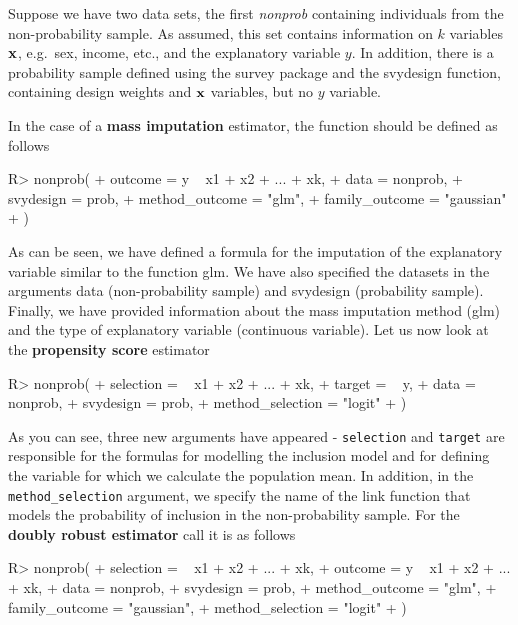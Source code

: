 \documentclass[
]{jss}
\begin{document}
Suppose we have two data sets, the first \textit{nonprob} containing
individuals from the non-probability sample. As assumed, this set
contains information on \(k\) variables \(\bold{x}\), e.g.~sex, income,
etc., and the explanatory variable \(y\). In addition, there is a
probability sample defined using the survey package and the svydesign
function, containing design weights and \(\bold{x}\) variables, but no
\(y\) variable.

In the case of a \textbf{mass imputation} estimator, the function should
be defined as follows

\begin{CodeChunk}
\begin{CodeInput}
R> nonprob(
+   outcome = y ~ x1 + x2 + ... + xk, 
+   data = nonprob, 
+   svydesign = prob, 
+   method_outcome = "glm", 
+   family_outcome = "gaussian"
+ )
\end{CodeInput}
\end{CodeChunk}

As can be seen, we have defined a formula for the imputation of the
explanatory variable similar to the function glm. We have also specified
the datasets in the arguments data (non-probability sample) and
svydesign (probability sample). Finally, we have provided information
about the mass imputation method (glm) and the type of explanatory
variable (continuous variable). Let us now look at the
\textbf{propensity score} estimator

\begin{CodeChunk}
\begin{CodeInput}
R> nonprob(
+   selection =  ~ x1 + x2 + ... + xk, 
+   target = ~ y, 
+   data = nonprob, 
+   svydesign = prob, 
+   method_selection = "logit"
+ )
\end{CodeInput}
\end{CodeChunk}

As you can see, three new arguments have appeared - \texttt{selection}
and \texttt{target} are responsible for the formulas for modelling the
inclusion model and for defining the variable for which we calculate the
population mean. In addition, in the \texttt{method\_selection}
argument, we specify the name of the link function that models the
probability of inclusion in the non-probability sample. For the
\textbf{doubly robust estimator} call it is as follows

\begin{CodeChunk}
\begin{CodeInput}
R> nonprob(
+   selection = ~ x1 + x2 + ... + xk, 
+   outcome = y ~ x1 + x2 + ... + xk, 
+   data = nonprob, 
+   svydesign = prob, 
+   method_outcome = "glm", 
+   family_outcome = "gaussian",
+   method_selection = "logit"
+ )
\end{CodeInput}
\end{CodeChunk}
\end{document}
